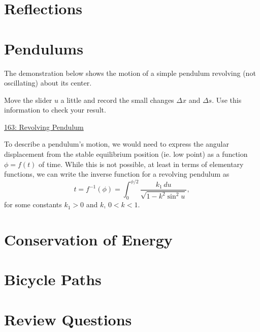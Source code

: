 \documentclass{ximera}
\begin{document}
\section*{Reflections}


\section*{Pendulums}

\begin{question}  \label{QDfdfgrenhht44}
The demonstration below shows the motion of a simple pendulum revolving (not oscillating) about its center.

\begin{exploration}
Move the slider $u$ a little and record the small changes $\Delta x$ and $\Delta s$. Use this information to check your result. 
\begin{onlineOnly}
    \begin{center}
\end{center}
\end{onlineOnly}

\href{https://www.desmos.com/calculator/9z2ivjrqk2}{163: Revolving Pendulum}
\end{exploration}

To describe a pendulum's motion, we would need to express the angular displacement from the stable equilibrium position (ie. low point) as a function $\phi = f(t)$ of time. While this is not possible, at least in terms of elementary functions, we can write the inverse function for a revolving pendulum as
\[
     t = f^{-1}(\phi) = \int_0^{\phi/2} \frac{k_1\, du}{\sqrt{1-k^2\sin^2u}} ,
\]
for some constants $k_1>0$ and $k$, $0<k<1$.


\end{question}


\section*{Conservation of Energy}


\section*{Bicycle Paths}




\section*{Review Questions}
\end{document}
